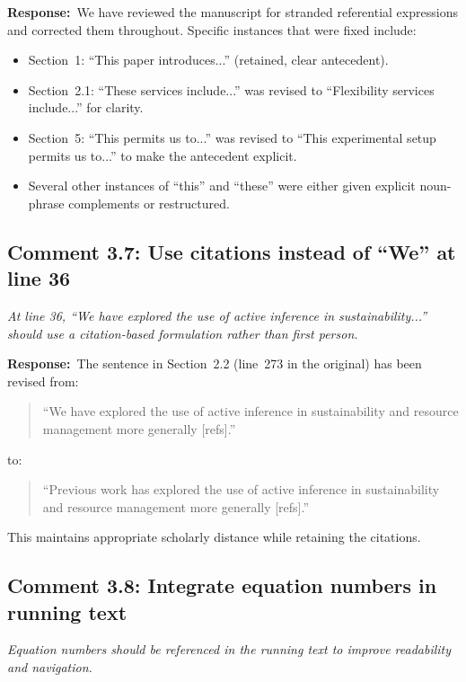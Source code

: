\documentclass[11pt]{article}
\newcommand{\reviewercomment}[1]{\textit{#1}}
\newcommand{\response}{\textbf{Response:}\ }
\begin{document}
\response We have reviewed the manuscript for stranded referential expressions and corrected them throughout. Specific instances that were fixed include:

\begin{itemize}
    \item Section~1: ``This paper introduces...'' (retained, clear antecedent).
    \item Section~2.1: ``These services include...'' was revised to ``Flexibility services include...'' for clarity.
    \item Section~5: ``This permits us to...'' was revised to ``This experimental setup permits us to...'' to make the antecedent explicit.
    \item Several other instances of ``this'' and ``these'' were either given explicit noun-phrase complements or restructured.
\end{itemize}

\subsection*{Comment 3.7: Use citations instead of ``We'' at line 36}

\reviewercomment{At line 36, ``We have explored the use of active inference in sustainability...'' should use a citation-based formulation rather than first person.}

\response The sentence in Section~2.2 (line~273 in the original) has been revised from:

\begin{quote}
``We have explored the use of active inference in sustainability and resource management more generally [refs].''
\end{quote}

to:

\begin{quote}
``Previous work has explored the use of active inference in sustainability and resource management more generally [refs].''
\end{quote}

This maintains appropriate scholarly distance while retaining the citations.

\subsection*{Comment 3.8: Integrate equation numbers in running text}

\reviewercomment{Equation numbers should be referenced in the running text to improve readability and navigation.}
\end{document}
